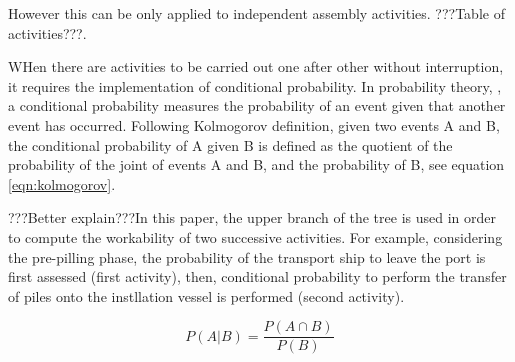 However this can be only applied to independent assembly activities. ???Table of activities???. 

WHen there are activities to be carried out one after other without interruption, it requires the implementation of conditional probability. In probability theory, \cite{Thalemann2012}, a conditional probability measures the probability of an event given that another event has occurred. Following Kolmogorov definition, given two events A and B, the conditional probability of A given B is defined as the quotient of the probability of the joint of events A and B, and the probability of B, see equation \ref{eqn:kolmogorov}.

???Better explain???In this paper, the upper branch of the tree is used in order to compute the workability of two successive activities. For example, considering the pre-pilling phase, the probability of the transport ship to leave the port is first assessed (first activity), then, conditional probability to perform the transfer of piles onto the instllation vessel is performed (second activity).

\begin{equation}
\label{eqn:kolmogorov}
P \left(A \vert B \right) = \frac{P \left(A \cap B \right)}{P \left( B \right)}
\end{equation}

